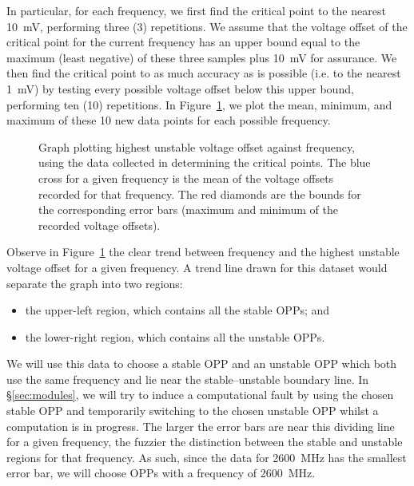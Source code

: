 In particular, for each frequency, we first find the critical point to the
nearest 10~mV, performing three (3) repetitions. We assume that the voltage
offset of the critical point for the current frequency has an upper bound equal
to the maximum (least negative) of these three samples plus 10~mV for assurance.
We then find the critical point to as much accuracy as is possible (i.e. to the 
nearest 1~mV) by testing every possible voltage offset below this upper bound,
performing ten (10) repetitions. In Figure~\ref{fig:critical-points-graph}, we
plot the mean, minimum, and maximum of these 10 new data points for each
possible frequency.

\begin{figure}[!htb]
    \caption{
        \label{fig:critical-points-graph}
        Graph plotting highest unstable voltage offset against frequency, using
        the data collected in determining the critical points. The blue cross
        for a given frequency is the mean of the voltage offsets recorded for
        that frequency. The red diamonds are the bounds for the corresponding
        error bars (maximum and minimum of the recorded voltage offsets).
    }
\end{figure}

Observe in Figure~\ref{fig:critical-points-graph} the clear trend between
frequency and the highest unstable voltage offset for a given frequency.
A trend line drawn for this dataset would separate the graph into two regions:

\begin{itemize}
    \item the upper-left region, which contains all the stable OPPs; and
    \item the lower-right region, which contains all the unstable OPPs.
\end{itemize}

We will use this data to choose a stable OPP and an unstable OPP which both use
the same frequency and lie near the stable–unstable boundary line. In
§\ref{sec:modules}, we will try to induce a computational fault by using the
chosen stable OPP and temporarily switching to the chosen unstable OPP whilst a
computation is in progress. The larger the error bars are near this dividing
line for a given frequency, the fuzzier the distinction between the stable and
unstable regions for that frequency. As such, since the data for 2600~MHz has
the smallest error bar, we will choose OPPs with a frequency of 2600~MHz.
